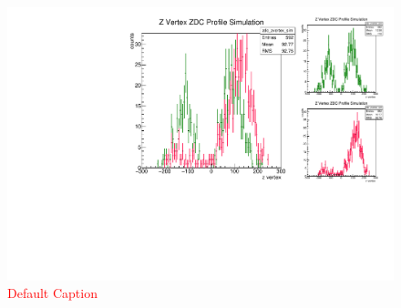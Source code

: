 \begin{figure}
\begin{center}
\includegraphics[width=\linewidth,height=\textheight,keepaspectratio]{../HourglassCorrection/figs/beta_star}
\caption{ \textcolor{red}{Default Caption} }
\label{fig:beta_star}
\end{center}
\end{figure}